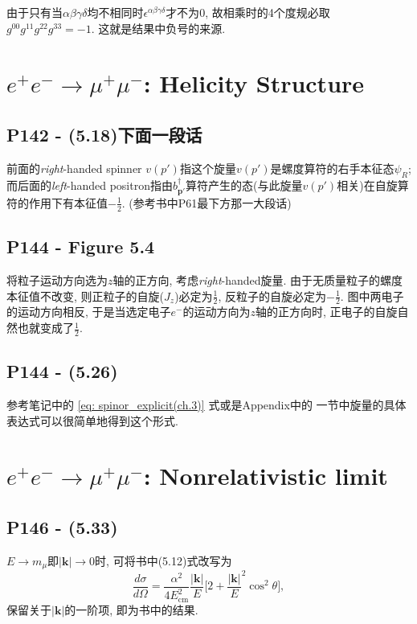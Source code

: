 由于只有当$\alpha\beta\gamma\delta$均不相同时$\epsilon^{\alpha\beta\gamma\delta}$才不为$0$, 故相乘时的4个度规必取$g^{00}g^{11}g^{22}g^{33}=-1$.
这就是结果中负号的来源.

\section{\texorpdfstring{$e^+e^- \rightarrow \mu^+\mu^-$}:: Helicity Structure}

\subsection{P142 - (5.18)下面一段话}

前面的\textit{right}-handed spinner $v(p')$指这个旋量$v(p')$是螺度算符的右手本征态$\psi_R$; 而后面的\textit{left}-handed positron指由$b^\dagger_{\mathbf{p}'}$算符产生的态(与此旋量$v(p')$相关)在自旋算符的作用下有本征值$-\frac{1}{2}$. (参考书中P61最下方那一大段话)

\subsection{P144 - Figure 5.4}

将粒子运动方向选为$z$轴的正方向, 考虑\textit{right}-handed旋量.
由于无质量粒子的螺度本征值不改变, 则正粒子的自旋($J_z$)必定为$\frac{1}{2}$, 反粒子的自旋必定为$-\frac{1}{2}$.
图中两电子的运动方向相反, 于是当选定电子$e^-$的运动方向为$z$轴的正方向时, 正电子的自旋自然也就变成了$\frac{1}{2}$.

\subsection{P144 - (5.26)}

参考笔记中的 \eqref{eq: spinor_explicit(ch.3)} 式或是Appendix中的  一节中旋量的具体表达式可以很简单地得到这个形式.

\section{\texorpdfstring{$e^+e^- \rightarrow \mu^+\mu^-$}:: Nonrelativistic limit}

\subsection{P146 - (5.33)}

$E\rightarrow m_{\mu}$即$|\mathbf{k}|\rightarrow 0$时, 可将书中(5.12)式改写为
\begin{equation}
  \frac{d\sigma}{d\Omega}=\frac{\alpha^2}{4E^2_\text{cm}}\frac{|\mathbf{k}|}{E}\biggl[2+ \frac{|\mathbf{k}|}{E}^2 \cos^2\theta\biggr],
\end{equation}
保留关于$|\mathbf{k}|$的一阶项, 即为书中的结果.
